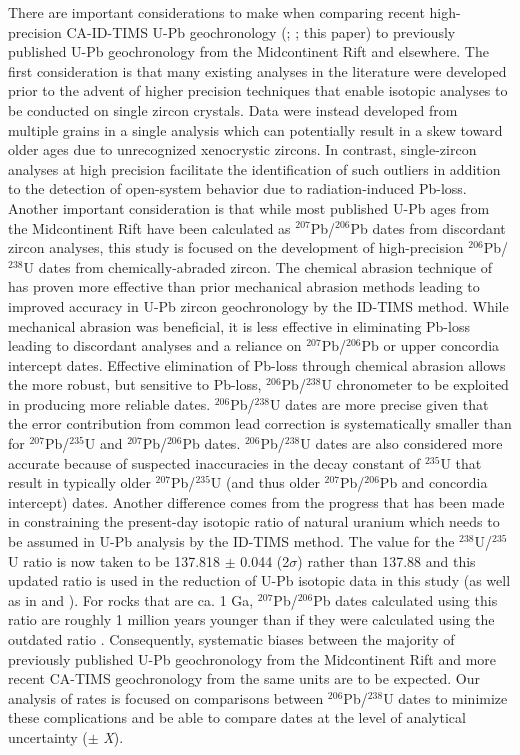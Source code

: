 \documentclass[11pt,letterpaper]{article}
\begin{document}
There are important considerations to make when comparing recent high-precision CA-ID-TIMS U-Pb geochronology (\citealp{Swanson-Hysell2014a}; \citealp{Fairchild2017a}; this paper) to previously published U-Pb geochronology from the Midcontinent Rift and elsewhere. The first consideration is that many existing analyses in the literature were developed prior to the advent of higher precision techniques that enable isotopic analyses to be conducted on single zircon crystals. Data were instead developed from multiple grains in a single analysis which can potentially result in a skew toward older ages due to unrecognized xenocrystic zircons. In contrast, single-zircon analyses at high precision facilitate the identification of such outliers in addition to the detection of open-system behavior due to radiation-induced Pb-loss. Another important consideration is that while most published U-Pb ages from the Midcontinent Rift have been calculated as $^{207}$Pb/$^{206}$Pb dates from discordant zircon analyses, this study is focused on the development of high-precision $^{206}$Pb/$^{238}$U dates from chemically-abraded zircon. The chemical abrasion technique of \cite{Mattinson2005a} has proven more effective than prior mechanical abrasion methods \citep{Krogh1982a} leading to improved accuracy in U-Pb zircon geochronology by the ID-TIMS method. While mechanical abrasion was beneficial, it is less effective in eliminating Pb-loss leading to discordant analyses and a reliance on $^{207}$Pb/$^{206}$Pb or upper concordia intercept dates. Effective elimination of Pb-loss through chemical abrasion allows the more robust, but sensitive to Pb-loss, $^{206}$Pb/$^{238}$U chronometer to be exploited in producing more reliable dates. $^{206}$Pb/$^{238}$U dates are more precise given that the error contribution from common lead correction is systematically smaller than for $^{207}$Pb/$^{235}$U and $^{207}$Pb/$^{206}$Pb dates. $^{206}$Pb/$^{238}$U dates are also considered more accurate because of suspected inaccuracies in the decay constant of $^{235}$U \citep{Schoene2006a, Mattinson2010a} that result in typically older $^{207}$Pb/$^{235}$U (and thus older $^{207}$Pb/$^{206}$Pb and concordia intercept) dates. Another difference comes from the progress that has been made in constraining the present-day isotopic ratio of natural uranium which needs to be assumed in U-Pb analysis by the ID-TIMS method. The value for the $^{238}$U/$^{235}$U ratio is now taken to be 137.818 $\pm$ 0.044 (2$\sigma$) rather than 137.88 \citep{Hiess2012a} and this updated ratio is used in the reduction of U-Pb isotopic data in this study (as well as in \citealp{Swanson-Hysell2014a} and \citealp{Fairchild2017a}). For rocks that are ca. 1 Ga, $^{207}$Pb/$^{206}$Pb dates calculated using this ratio are roughly 1 million years younger than if they were calculated using the outdated ratio \citep{Hiess2012a}. Consequently, systematic biases between the majority of previously published U-Pb geochronology from the Midcontinent Rift and more recent CA-TIMS geochronology from the same units are to be expected. Our analysis of rates is focused on comparisons between $^{206}$Pb/$^{238}$U dates to minimize these complications and be able to compare dates at the level of analytical uncertainty ($\pm$ \textit{X}).
\end{document}
